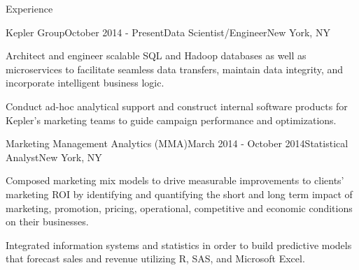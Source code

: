 \documentclass{resume} %
\begin{document}
\begin{rSection}{Experience}

\begin{rSubsection}{Kepler Group}{October 2014 - Present}{Data Scientist/Engineer}{New York, NY}
\item Architect and engineer scalable SQL and Hadoop databases as well as microservices to facilitate seamless data transfers, maintain data integrity, and incorporate intelligent business logic.
\item Conduct ad-hoc analytical support and construct internal software products for Kepler's marketing teams to guide campaign performance and optimizations.
\end{rSubsection}


\begin{rSubsection}{Marketing Management Analytics (MMA)}{March 2014 - October 2014}{Statistical Analyst}{New York, NY}
\item Composed marketing mix models to drive measurable improvements to clients' marketing ROI by identifying and quantifying the short and long term impact of marketing, promotion, pricing, operational, competitive and economic conditions on their businesses.
\item Integrated information systems and statistics in order to build predictive models that forecast sales and revenue utilizing R, SAS, and Microsoft Excel.
\end{rSubsection}



\end{rSection}
\end{document}
